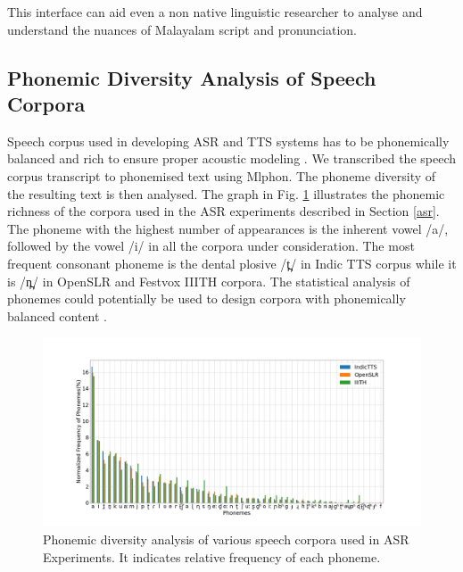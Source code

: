 \documentclass{ieeeaccess}
\begin{document}
This interface can aid even a non native linguistic researcher to analyse and understand the nuances of Malayalam script and pronunciation.





\subsection{Phonemic Diversity Analysis of Speech Corpora}

Speech corpus used in developing ASR and TTS systems has to be phonemically balanced and rich to ensure proper acoustic modeling  \cite{malviya2016structural}. We transcribed the speech corpus transcript to phonemised text using Mlphon. The phoneme diversity of the resulting text is then analysed. The graph in Fig. \ref{phoneticrichness} illustrates the phonemic richness of the corpora used in the ASR experiments described in Section \ref{asr}. The phoneme with the highest number of appearances is the inherent vowel {\ipa /a/}, followed by the vowel {\ipa /i/} in all the corpora under consideration. The most frequent consonant phoneme is the dental plosive {\ipa  /t̪/} in Indic TTS  \cite{baby2016resources} corpus while it is {\ipa /n̪/} in OpenSLR \cite{he-etal-2020-open} and  Festvox IIITH \cite{prahallad2012iiit} corpora. The statistical analysis of phonemes could potentially be used to design corpora with phonemically balanced content \cite{torres2019emilia}.


\begin{figure}[h]
	\centering
	\includegraphics[width=\linewidth, trim=1cm 1cm 2cm 2cm,clip]{phoneticrichness.jpg}
	\caption{Phonemic diversity analysis of various speech corpora used in ASR Experiments. It indicates relative frequency of each phoneme.}
	\label{phoneticrichness}
\end{figure}
\end{document}
